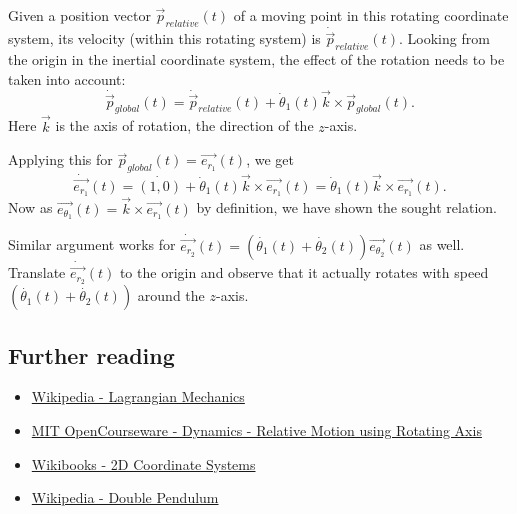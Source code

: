 \documentclass[12pt]{article}
\renewcommand{\vec}[1]{\ensuremath{\overrightarrow{#1}}}
\begin{document}
Given a position vector $\vec{p}_{relative}(t)$ of a moving point in this rotating coordinate system, its velocity (within this rotating system) is $\dot{\vec{p}}_{relative}(t)$. Looking from the origin in the inertial coordinate system, the effect of the rotation needs to be taken into account:
$$\dot{\vec{p}}_{global}(t) = \dot{\vec{p}}_{relative}(t) + \dot\theta_1(t) \vec{k} \times \vec{p}_{global}(t).$$
Here $\vec{k}$ is the axis of rotation, the direction of the $z$-axis.

Applying this for $\vec{p}_{global}(t) = \vec{e_{r_1}}(t)$, we get 
$$\dot{\vec{e_{r_1}}}(t) = \dot{(1,0)} + \dot\theta_1(t) \vec{k} \times \vec{e_{r_1}}(t) = \dot\theta_1(t) \vec{k} \times \vec{e_{r_1}}(t).$$
Now as $\vec{e_{\theta_1}}(t) = \vec{k} \times \vec{e_{r_1}}(t)$ by definition, we have shown the sought relation.

\vspace{1cm}
Similar argument works for $\dot{\vec{e_{r_2}}}(t) = (\dot{\theta_1}(t) + \dot{\theta_2}(t)) \vec{e_{\theta_2}}(t)$ as well. 
Translate $\dot{\vec{e_{r_2}}}(t)$ to the origin and observe that it actually rotates with speed 
$(\dot{\theta_1}(t) + \dot{\theta_2}(t))$ around the $z$-axis.

\subsection*{Further reading}
\begin{itemize}
 \item \href{http://en.wikipedia.org/wiki/Lagrangian_mechanics#Euler.E2.80.93Lagrange_equations}{Wikipedia - Lagrangian Mechanics}
 \item \href{http://ocw.mit.edu/courses/aeronautics-and-astronautics/16-07-dynamics-fall-2009/lecture-notes/MIT16_07F09_Lec08.pdf}{MIT OpenCourseware - Dynamics - Relative Motion using Rotating Axis}
 \item \href{http://en.wikibooks.org/wiki/Kinematics/2D_Coordinate_Systems}{Wikibooks - 2D Coordinate Systems}
 \item \href{http://en.wikipedia.org/wiki/Double_pendulum}{Wikipedia - Double Pendulum}
\end{itemize}
\end{document}
